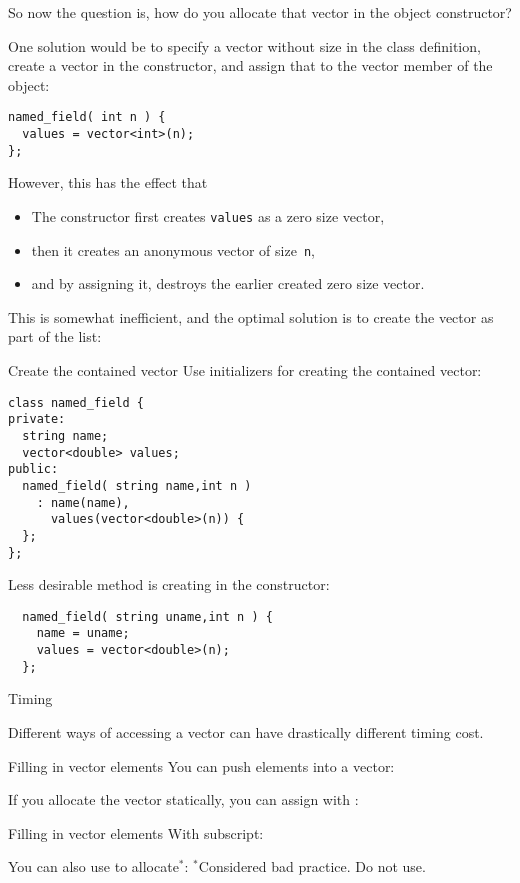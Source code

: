 So now the question is, how do you allocate that vector
in the object constructor?

One solution would be to specify a vector without size in the class
definition, create a vector in the constructor, and assign that
to the vector member of the object:
\begin{lstlisting}
named_field( int n ) {
  values = vector<int>(n);
};
\end{lstlisting}
However, this has the effect that
\begin{itemize}
\item The constructor first creates \lstinline{values} as a zero size vector,
\item then it creates an anonymous vector of size~\lstinline{n},
\item and by assigning it, destroys the earlier created zero size vector.
\end{itemize}
This is somewhat inefficient, and the optimal solution is
to create the vector as part of the
 list:

\begin{block}{Create the contained vector}
  \label{sl:class-has-vector}
  Use initializers for creating the contained vector:
  \lstset{style=snippetcode}
\begin{lstlisting}
class named_field {
private:
  string name;
  vector<double> values;
public:
  named_field( string name,int n )
    : name(name),
      values(vector<double>(n)) {
  };
};
\end{lstlisting}

Less desirable method is creating in the constructor:
\begin{lstlisting}
  named_field( string uname,int n ) {
    name = uname;
    values = vector<double>(n);
  };
\end{lstlisting}
\end{block}

 {Timing}

Different ways of accessing a vector can have drastically different
timing cost.

\begin{block}{Filling in vector elements}
  \label{sl:vect-extend-code}
  You can push elements into a vector:

  If you allocate the vector statically, you can assign with :
\end{block}

\begin{block}{Filling in vector elements}
  \label{sl:vect-extend-code2}
  With subscript:

  You can also use  to allocate$^*$:
  $^*$Considered bad practice. Do not use.
\end{block}

